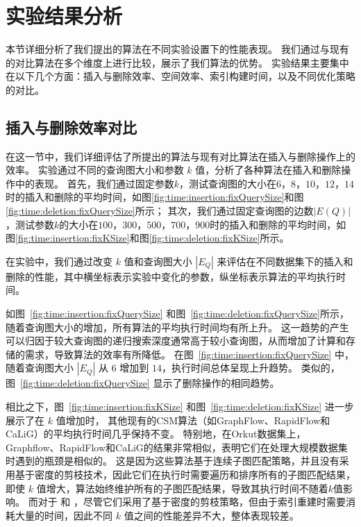 \section{实验结果分析}%
\label{ch5:overall-compare}
本节详细分析了我们提出的算法在不同实验设置下的性能表现。
我们通过与现有的对比算法在多个维度上进行比较，展示了我们算法的优势。
实验结果主要集中在以下几个方面：插入与删除效率、空间效率、索引构建时间，以及不同优化策略的对比。
\subsection{插入与删除效率对比}
\label{ch5:insertion-deletion}
在这一节中，我们详细评估了所提出的算法与现有对比算法在插入与删除操作上的效率。
实验通过不同的查询图大小和参数 $k$ 值，分析了各种算法在插入和删除操作中的表现。
首先，我们通过固定参数$k$，测试查询图的大小在$6$，$8$，$10$，$12$，$14$时的插入和删除的平均时间，如图\ref{fig:time:insertion:fixQuerySize}和图\ref{fig:time:deletion:fixQuerySize}所示；
其次，我们通过固定查询图的边数$|E(Q)|$，测试参数$k$的大小在$100$，$300$，$500$，$700$，$900$时的插入和删除的平均时间，如图\ref{fig:time:insertion:fixKSize}和图\ref{fig:time:deletion:fixKSize}所示。






在实验中，我们通过改变 $k$ 值和查询图大小 $|E_Q|$ 来评估在不同数据集下的插入和删除的性能，其中横坐标表示实验中变化的参数，纵坐标表示算法的平均执行时间。



如图~\ref{fig:time:insertion:fixQuerySize} 和图~\ref{fig:time:deletion:fixQuerySize}所示，随着查询图大小的增加，所有算法的平均执行时间均有所上升。
这一趋势的产生可以归因于较大查询图的递归搜索深度通常高于较小查询图，从而增加了计算和存储的需求，导致算法的效率有所降低。
在图~\ref{fig:time:insertion:fixQuerySize} 中，随着查询图大小 $|E_Q|$ 从 $6$ 增加到 $14$，执行时间总体呈现上升趋势。
类似的，图~\ref{fig:time:deletion:fixQuerySize} 显示了删除操作的相同趋势。

相比之下，图~\ref{fig:time:insertion:fixKSize} 和图~\ref{fig:time:deletion:fixKSize} 进一步展示了在 $k$ 值增加时，
其他现有的CSM算法（如GraphFlow、RapidFlow和CaLiG）的平均执行时间几乎保持不变。
特别地，在Orkut数据集上，Graphflow、RapidFlow和CaLiG的结果非常相似，表明它们在处理大规模数据集时遇到的瓶颈是相似的。
这是因为这些算法基于连续子图匹配策略，并且没有采用基于密度的剪枝技术，因此它们在执行时需要遍历和排序所有的子图匹配结果，即使 $k$ 值增大，算法始终维护所有的子图匹配结果，导致其执行时间不随着$k$值影响。
而对于 \itk 和 \pm，尽管它们采用了基于密度的剪枝策略，但由于索引重建时需要消耗大量的时间，因此不同 $k$ 值之间的性能差异不大，整体表现较差。

